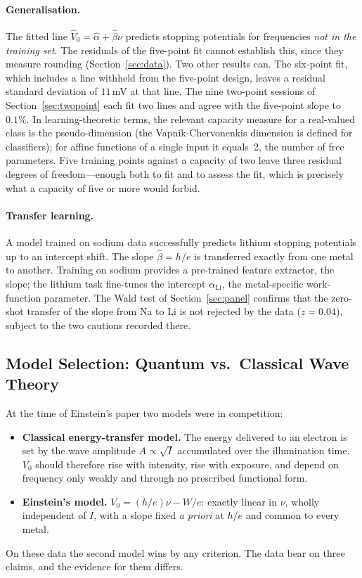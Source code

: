 \documentclass[12pt]{article}
\begin{document}
\paragraph{Generalisation.}
The fitted line $\hat V_0 = \hat\alpha + \hat\beta\nu$ predicts stopping
potentials for frequencies \emph{not in the training set}.  The residuals of
the five-point fit cannot establish this, since they measure rounding
(Section~\ref{sec:data}).  Two other results can.  The six-point fit, which
includes a line withheld from the five-point design, leaves a residual
standard deviation of $11$\,mV at that line.  The nine two-point sessions of
Section~\ref{sec:twopoint} each fit two lines and agree with the five-point
slope to $0.1\%$.  In
learning-theoretic terms, the relevant capacity measure for a real-valued
class is the pseudo-dimension (the Vapnik-Chervonenkis dimension is defined
for classifiers); for affine functions of a single input it equals~2, the
number of free parameters.  Five training points against a capacity of two
leave three residual degrees of freedom---enough both to fit and to assess the
fit, which is precisely what a capacity of five or more would forbid.

\paragraph{Transfer learning.}
A model trained on sodium data successfully predicts lithium stopping
potentials up to an intercept shift.  The slope $\hat\beta = h/e$ is
transferred exactly from one metal to another.  Training on sodium provides a
pre-trained feature extractor, the slope; the lithium task fine-tunes the
intercept $\alpha_{\mathrm{Li}}$, the metal-specific work-function parameter.  The Wald test of
Section~\ref{sec:panel} confirms that the zero-shot transfer of the slope
from Na to Li is not rejected by the data ($z = 0.04$), subject to the two
cautions recorded there.

\subsection{Model Selection: Quantum vs.\ Classical Wave Theory}

At the time of Einstein's paper two models were in competition:
\begin{itemize}
  \item \textbf{Classical energy-transfer model.}  The energy delivered to an
    electron is set by the wave amplitude $A \propto \sqrt{I}$ accumulated over
    the illumination time.  $V_0$ should therefore rise with intensity, rise
    with exposure, and depend on frequency only weakly and through no
    prescribed functional form.
  \item \textbf{Einstein's model.}  $V_0 = (h/e)\nu - W/e$: exactly linear in
    $\nu$, wholly independent of $I$, with a slope fixed \emph{a priori} at
    $h/e$ and common to every metal.
\end{itemize}
On these data the second model wins by any criterion.  The data bear on three
claims, and the evidence for them differs.
\end{document}
